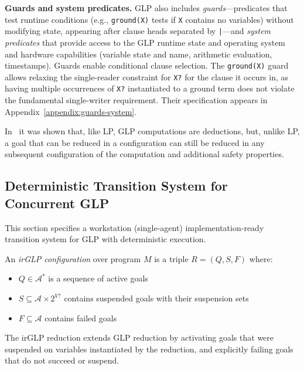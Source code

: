 \documentclass[runningheads,thm-restate]{llncs}
\newcommand{\mypara}[1]{\smallskip\noindent\textbf{#1.}}
\begin{document}
\mypara{Guards and system predicates}
GLP also includes \emph{guards}—predicates that test runtime conditions (e.g., \verb|ground(X)| tests if \verb|X| contains no variables) without modifying state, appearing after clause heads separated by \verb=|=—and \emph{system predicates} that provide access to the GLP runtime state and operating system and hardware capabilities (variable state and name, arithmetic evaluation, timestamps). Guards enable conditional clause selection. The \verb|ground(X)| guard allows relaxing the single-reader constraint for \verb|X?| for the clause it occurs in, as having multiple occurrences of \verb|X?| instantiated to a ground term does not violate the fundamental single-writer requirement.
Their specification appears in Appendix~\ref{appendix:guards-system}.

In~\cite{shapiro2025glp} it was shown that, like LP, GLP computations are deductions, but, unlike LP, a goal that can be reduced in a configuration can still be reduced in any subsequent configuration of the computation and additional safety properties.



\subsection{Deterministic Transition System for Concurrent GLP}\label{appendix:irGLP}

This section specifies a workstation (single-agent) implementation-ready transition system for GLP with deterministic execution. 

\begin{definition}
An \emph{irGLP configuration} over program $M$ is a triple $R = (Q, S, F)$ where:
\begin{itemize}
\item $Q \in \mathcal{A}^*$ is a sequence of active goals
\item $S \subseteq \mathcal{A} \times 2^{V?}$ contains suspended goals with their suspension sets
\item $F \subseteq \mathcal{A}$ contains failed goals
\end{itemize}
\end{definition}

The irGLP reduction extends GLP reduction by activating goals that were suspended on variables instantiated by the reduction, and explicitly failing goals that do not succeed or suspend.
\end{document}
